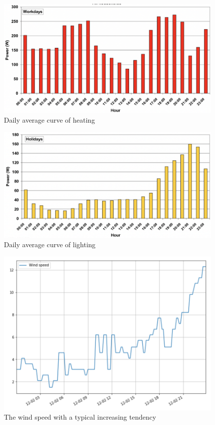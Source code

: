 \documentclass[12pt,a4paper]{report}
\begin{document}
    \begin{figure}[ht]
        \centerline{\includegraphics[scale=1]{heating}}
        \caption{Daily average curve of heating}
        \label{fig_heating}
    \end{figure}
    \begin{figure}[ht]
        \centerline{\includegraphics[scale=1]{lighting}}
        \caption{Daily average curve of lighting}
        \label{fig_lighting}
    \end{figure}

    \begin{figure}[ht]
        \centerline{\includegraphics[scale=1]{1202}}
        \caption{The wind speed with a typical increasing tendency}
        \label{fig_1202}
    \end{figure}
\end{document}
